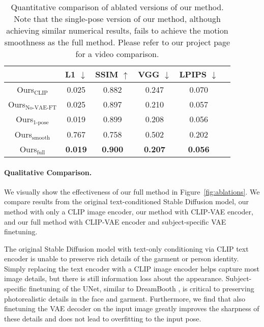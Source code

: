     \begin{table}[h!]
        \begin{center}
        \begin{tabular}{c c c c c c }
        \hline
        & L1 $\downarrow$ & SSIM $\uparrow$ & VGG  $\downarrow$ & LPIPS  $\downarrow$  \\
        \hline\hline
        Ours$_{\text{CLIP}}$ & 0.025 & 0.882 & 0.247 & 0.070 \\
        Ours$_{\text{No-VAE-FT}}$ & 0.025 & 0.897 & 0.210 & 0.057 \\
        Ours$_{\text{1-pose}}$ & 0.019 & 0.899 & 0.208 & 0.056\\
        Ours$_{\text{smooth}}$ & 0.767 & 0.758 & 0.502 & 0.202\\
        Ours$_{\text{full}}$ & \textbf{0.019} & \textbf{0.900} & \textbf{0.207} & \textbf{0.056} \\
        \hline
        \end{tabular}
        \end{center}
        \caption{Quantitative comparison of ablated versions of our method. Note that the single-pose version of our method, although achieving similar numerical results, fails to achieve the motion smoothness as the full method. Please refer to our project page for a video comparison.
        }
        \label{tab:quantitative-ablation}
        \end{table}

    \paragraph{Qualitative Comparison.} We visually show the effectiveness of our full method in Figure~\ref{fig:ablations}. We compare results from the original text-conditioned Stable Diffusion model, our method with only a CLIP image encoder, our method with CLIP-VAE encoder, and our full method with CLIP-VAE encoder and subject-specific VAE finetuning. 
    
    The original Stable Diffusion model with text-only conditioning via CLIP text encoder is unable to preserve rich details of the garment or person identity. Simply replacing the text encoder with a CLIP image encoder helps capture most image details, but there is still information loss about the appearance. Subject-specific finetuning of the UNet, similar to DreamBooth \cite{dreambooth}, is critical to preserving photorealistic details in the face and garment. Furthermore, we find that also finetuning the VAE decoder on the input image greatly improves the sharpness of these details and does not lead to overfitting to the input pose. 
    
